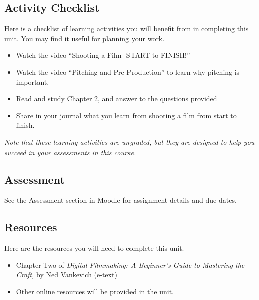 \documentclass[
]{book}
\providecommand{\tightlist}{%
  \setlength{\itemsep}{0pt}\setlength{\parskip}{0pt}}
\begin{document}
\hypertarget{activity-checklist-1}{%
\subsection*{Activity Checklist}\label{activity-checklist-1}}

\begin{reflect}
Here is a checklist of learning activities you will benefit from in completing this unit. You may find it useful for planning your work.

\begin{itemize}
\tightlist
\item
  Watch the video ``Shooting a Film- START to FINISH!''
\item
  Watch the video ``Pitching and Pre-Production'' to learn why pitching is important.
\item
  Read and study Chapter 2, and answer to the questions provided
\item
  Share in your journal what you learn from shooting a film from start to finish.
\end{itemize}

\emph{Note that these learning activities are ungraded, but they are designed to help you succeed in your assessments in this course.}
\end{reflect}

\hypertarget{assessment-2}{%
\subsection*{Assessment}\label{assessment-2}}

See the Assessment section in Moodle for assignment details and due dates.

\hypertarget{resources-1}{%
\subsection*{Resources}\label{resources-1}}

Here are the resources you will need to complete this unit.

\begin{itemize}
\tightlist
\item
  Chapter Two of \emph{Digital Filmmaking: A Beginner's Guide to Mastering the Craft,} by Ned Vankevich (e-text)
\item
  Other online resources will be provided in the unit.
\end{itemize}
\end{document}
